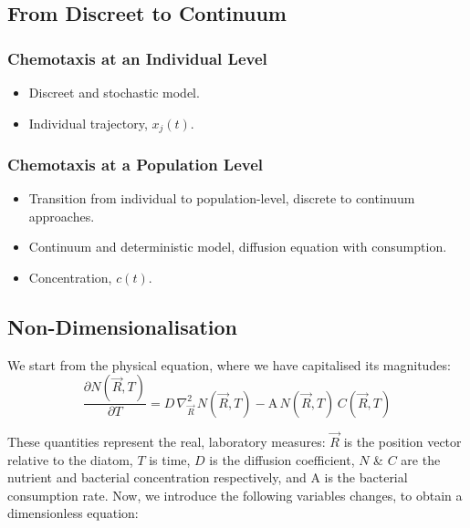 \subsection{From Discreet to Continuum}

\subsubsection*{Chemotaxis at an Individual Level}

\begin{itemize}
    \item Discreet and stochastic model.
    \item Individual trajectory, \( x_j(t) \).
\end{itemize}\subsubsection*{Chemotaxis at a Population Level}

\begin{itemize}
    \item Transition from individual to population-level, discrete to continuum approaches.
    \item Continuum and deterministic model, diffusion equation with consumption.
    \item Concentration, \( c(t) \).
\end{itemize}

\subsection{Non-Dimensionalisation}

We start from the physical equation, where we have capitalised its magnitudes:
\begin{equation}
    \frac{\partial N(\vec{R}, T)}{\partial T} =
    D \, \nabla^2_{\vec{R}} \, N(\vec{R}, T)
    - \mathrm{A} \, N(\vec{R}, T) \,C(\vec{R}, T)
\label{eq:Diff_physical}
\end{equation}

These quantities represent the real, laboratory measures:
\(\vec{R}\) is the position vector relative to the diatom,
\(T\) is time,
\(D\) is the diffusion coefficient,
\(N\) \& \(C\) are the nutrient and bacterial concentration respectively, and
\(\mathrm{A}\) is the bacterial consumption rate.
Now, we introduce the following variables changes, to obtain a dimensionless equation:

